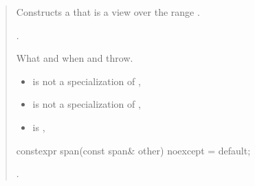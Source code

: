\documentclass{wg21}
\begin{document}
\begin{quote}
\begin{addedblock}
\begin{itemdescr}
	\pnum
	\effects
	Constructs a  that is a view over the range .

	\pnum
	\ensures
	.

	\pnum
	\throws
	What and when  and  throw.

	\pnum
	\constraints
	\begin{itemize}
		\item {} is not a specialization of ,
		\item {} is not a specialization of ,
		\item {} is ,
	\end{itemize}
\end{itemdescr}
\end{addedblock}

\begin{itemdecl}
constexpr span(const span& other) noexcept = default;
\end{itemdecl}
\begin{itemdescr}
	\pnum
	\ensures
	.
\end{itemdescr}


\end{quote}
\end{document}
